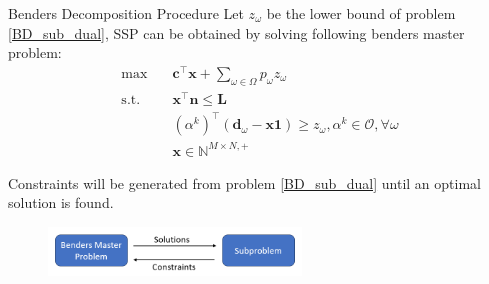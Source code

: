 \begin{frame}{Benders Decomposition Procedure}
  \small
  Let $z_{\omega}$ be the lower bound of problem \eqref{BD_sub_dual}, SSP can be obtained by solving following benders master problem:
  \begin{equation}\label{BD_master2}
    \begin{aligned}
      \max \quad & \mathbf{c}^{\intercal} \mathbf{x} + \sum_{\omega \in \Omega} p_{\omega} z_{\omega} \\
      \text {s.t.} \quad & \mathbf{x}^{\intercal} \mathbf{n} \leq \mathbf{L} \\
      & (\alpha^{k})^{\intercal}(\mathbf{d}_{\omega}- \mathbf{x} \mathbf{1}) \geq z_{\omega}, \alpha^k \in \mathcal{O}, \forall \omega \\
       & \mathbf{x} \in \mathbb{N}^{M \times N, +}
    \end{aligned}
\end{equation} 

  Constraints will be generated from problem \eqref{BD_sub_dual} until an optimal solution is found.

  \begin{figure}[ht]
    \centering
    \includegraphics[width = 0.6\textwidth]{./images/BD.png}
  \end{figure}
\end{frame}





